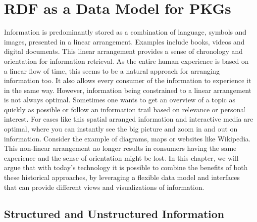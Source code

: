 \chapter{RDF as a Data Model for PKGs} \label{ch:model}



Information is predominantly stored as a combination of language, symbols and images, presented in a linear arrangement. Examples include books, videos and digital documents. This linear arrangement provides a sense of chronology and orientation for information retrieval. As the entire human experience is based on a linear flow of time, this seems to be a natural approach for arranging information too. It also allows every consumer of the information to experience it in the same way. However, information being constrained to a linear arrangement is not always optimal. Sometimes one wants to get an overview of a topic as quickly as possible or follow an information trail based on relevance or personal interest. For cases like this spatial arranged information and interactive media are optimal, where you can instantly see the big picture and zoom in and out on information. Consider the example of diagrams, maps or websites like Wikipedia. This non-linear arrangement no longer results in consumers having the same experience and the sense of orientation might be lost. In this chapter, we will argue that with today's technology it is possible to combine the benefits of both these historical approaches, by leveraging a flexible data model and interfaces that can provide different views and visualizations of information. 

\section{Structured and Unstructured Information}

